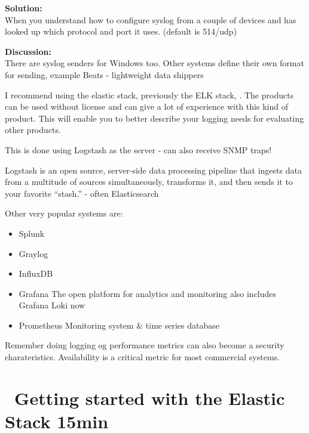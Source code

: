 \documentclass[a4paper,11pt,notitlepage]{report}
\begin{document}
{\bf Solution:}\\
When you understand how to configure syslog from a couple of devices and has looked up which protocol and port it uses. (default is 514/udp)

{\bf Discussion:}\\
There are syslog senders for Windows too. Other systems define their own format for sending, example Beats - lightweight data shippers 

I recommend using the elastic stack, previously the ELK stack, . The products can be used without license and can give a lot of experience with this kind of product. This will enable you to better describe your logging needs for evaluating other products.

This is done using Logstash as the server - can also receive SNMP traps!

Logstash is an open source, server-side data processing pipeline that ingests data from a multitude of sources simultaneously, transforms it, and then sends it to your favorite “stash.” - often Elasticsearch

Other very popular systems are:

\begin{itemize}
\item Splunk 
\item Graylog 
\item InfluxDB 
\item Grafana The open platform for analytics and monitoring  also includes Grafana Loki now 
\item Prometheus Monitoring system \& time series database 
\end{itemize}

Remember doing logging og performance metrics can also become a security charateristics. Availability is a critical metric for most commercial systems.


\chapter{\faInfoCircle\ Getting started with the Elastic Stack 15min}
\label{gettingstartedelastic}

\end{document}
